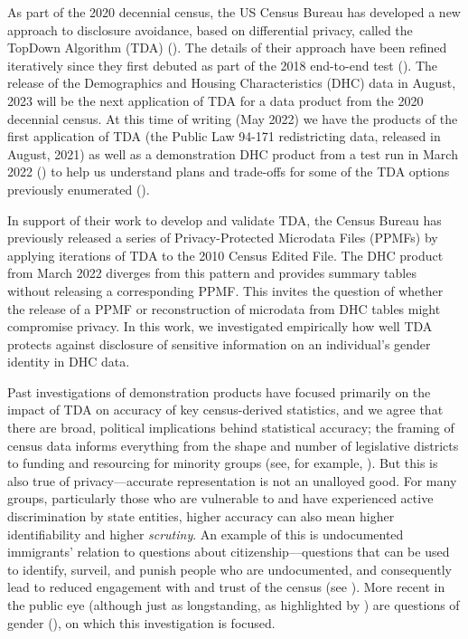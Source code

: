 \documentclass{jpc} %
\theoremstyle{plain}\newtheorem{satz}[thm]{Satz} %
\begin{document}
As part of the 2020 decennial census, the US Census Bureau has developed a new approach to disclosure avoidance, based on differential privacy, called the TopDown Algorithm (TDA) (\cite{abowd2019census}).  The details of their approach have been refined iteratively since they first debuted as part of the 2018 end-to-end test (\cite{garfinkel2019end}).  The release of the Demographics and Housing Characteristics (DHC) data in August, 2023 will be the next application of TDA for a data product from the 2020 decennial census. At this time of writing (May 2022) we have the products of the first application of TDA (the Public Law 94-171 redistricting data, released in August, 2021) as well as a demonstration DHC product from a test run in March 2022 (\cite{census2022demonstration}) to help us understand plans and trade-offs for some of the TDA options previously enumerated  (\cite{petti2019differential}).

In support of their work to develop and validate TDA,  the Census Bureau has previously released a series of Privacy-Protected Microdata Files (PPMFs) by applying iterations of TDA to the 2010 Census Edited File.  The DHC product from March 2022 diverges from this pattern and provides summary tables without releasing a corresponding PPMF.  This invites the question of whether the release of a PPMF or reconstruction of microdata from DHC tables might compromise privacy.  In this work, we investigated empirically how well TDA protects against disclosure of sensitive information on an individual's gender identity in DHC data.

Past investigations of demonstration products have focused primarily on the impact of TDA on accuracy of key census-derived statistics,
and we agree that there are broad, political implications behind statistical accuracy; the framing of census data informs everything from the shape and number of legislative districts to funding and resourcing for minority groups (see, for example, \cite{thompson2012making}). But this is also true of privacy---accurate representation is not an unalloyed good. For many groups, particularly those who are vulnerable to and have experienced active discrimination by state entities, higher accuracy can also mean higher identifiability and higher \textit{scrutiny}. An example of this is undocumented immigrants' relation to questions about citizenship---questions that can be used to identify, surveil, and punish people who are undocumented, and consequently lead to reduced engagement with and trust of the census (see \cite{barreto2019}). More recent in the public eye (although just as longstanding, as highlighted by \cite{canaday2009straight}) are questions of gender (\cite{singer2015profusion}), on which this investigation is focused.
\end{document}
